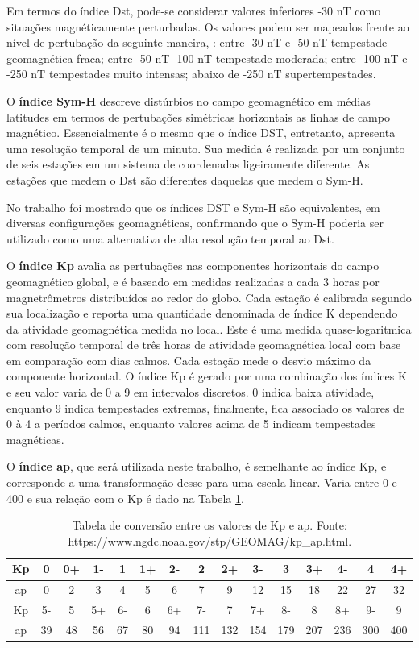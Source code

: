 Em termos do índice Dst, pode-se considerar valores inferiores -30 nT como situações magnéticamente perturbadas. Os valores podem ser mapeados frente ao nível de pertubação da seguinte maneira, \cite{GONZALEZ:1994}: entre -30 nT e -50 nT tempestade geomagnética fraca; entre -50 nT -100 nT tempestade moderada; entre -100 nT e -250 nT tempestades muito intensas; abaixo de -250 nT supertempestades.

O {\bf índice Sym-H} descreve distúrbios no campo geomagnético em médias latitudes em termos de pertubações simétricas horizontais as linhas de campo magnético. Essencialmente é o mesmo que o índice DST, entretanto, apresenta uma resolução temporal de um minuto. Sua medida é realizada por um conjunto de seis estações em um sistema de coordenadas ligeiramente diferente. As estações que medem o Dst são diferentes daquelas que medem o Sym-H.

No trabalho \cite{WANLISS:2006} foi mostrado que os índices DST e Sym-H são equivalentes, em diversas configurações geomagnéticas, confirmando que o Sym-H poderia ser utilizado como uma alternativa de alta resolução temporal ao Dst.

O {\bf índice Kp} avalia as pertubações nas componentes horizontais do campo geomagnético global, e é baseado em medidas realizadas a cada 3 horas por magnetrômetros distribuídos ao redor do globo. Cada estação é calibrada segundo sua localização e reporta uma quantidade denominada de índice K dependendo da atividade geomagnética medida no local. Este é uma medida quase-logaritmica com resolução temporal de três horas de atividade geomagnética local com base em comparação com dias calmos. Cada estação mede o desvio máximo da componente horizontal. O índice Kp é gerado por uma combinação dos índices K e seu valor varia de 0 a 9 em intervalos discretos. 0 indica baixa atividade, enquanto 9 indica tempestades extremas, finalmente, fica associado os valores de 0 à 4 a períodos calmos, enquanto valores acima de 5 indicam tempestades magnéticas.

O {\bf índice ap}, que será utilizada neste trabalho, é semelhante ao índice Kp, e corresponde a uma transformação desse para uma escala linear. Varia entre 0 e 400 e sua relação com o Kp é dado na Tabela \ref{tab:kptoap}.

\begin{table}[hhh]
\begin{tabular}{|c|c|c|c|c|c|c|c|c|c|c|c|c|c|c|} \hline
Kp & 0  & 0+ & 1- & 1  & 1+ & 2- & 2   & 2+  & 3-  & 3   & 3+  & 4-  & 4   & 4+  \\ \hline
ap & 0  & 2  & 3  & 4  & 5  & 6  & 7   & 9   & 12  & 15  & 18  & 22  & 27  & 32  \\ \hline
Kp & 5- & 5  & 5+ & 6- & 6  & 6+ & 7-  & 7   & 7+  & 8-  & 8   & 8+  & 9-  & 9   \\ \hline
ap & 39 & 48 & 56 & 67 & 80 & 94 & 111 & 132 & 154 & 179 & 207 & 236 & 300 & 400 \\ \hline
\end{tabular}
\caption{Tabela de conversão entre os valores de Kp e ap. Fonte: https://www.ngdc.noaa.gov/stp/GEOMAG/kp\_ap.html.}
\label{tab:kptoap}
\end{table}

